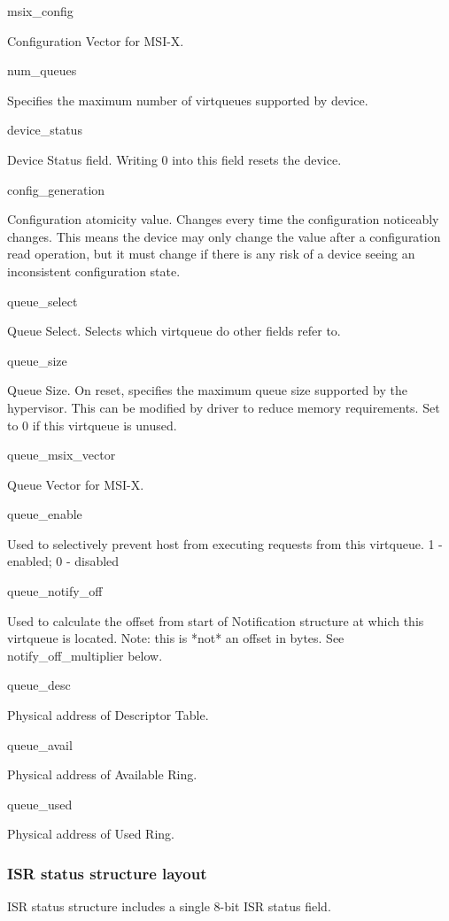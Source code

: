 msix_config

        Configuration Vector for MSI-X.

num_queues

        Specifies the maximum number of virtqueues supported by device.

device_status

        Device Status field. Writing 0 into this field resets the
        device.

config_generation

        Configuration atomicity value.  Changes every time the
        configuration noticeably changes.  This means the device may
        only change the value after a configuration read operation,
        but it must change if there is any risk of a device seeing an
        inconsistent configuration state.

queue_select

        Queue Select. Selects which virtqueue do other fields refer to.

queue_size

        Queue Size.  On reset, specifies the maximum queue size supported by
        the hypervisor. This can be modified by driver to reduce memory requirements.
        Set to 0 if this virtqueue is unused.

queue_msix_vector

        Queue Vector for MSI-X.

queue_enable

        Used to selectively prevent host from executing requests from this virtqueue.
        1 - enabled; 0 - disabled

queue_notify_off

        Used to calculate the offset from start of Notification structure at
        which this virtqueue is located.
        Note: this is *not* an offset in bytes. See notify_off_multiplier below.

queue_desc

        Physical address of Descriptor Table.

queue_avail

        Physical address of Available Ring.

queue_used

        Physical address of Used Ring.

\subsubsection{ISR status structure layout}\label{sec:Virtio Transport Options / Virtio Over PCI Bus / PCI Device Layout / ISR status structure layout}
ISR status structure includes a single 8-bit ISR status field.

